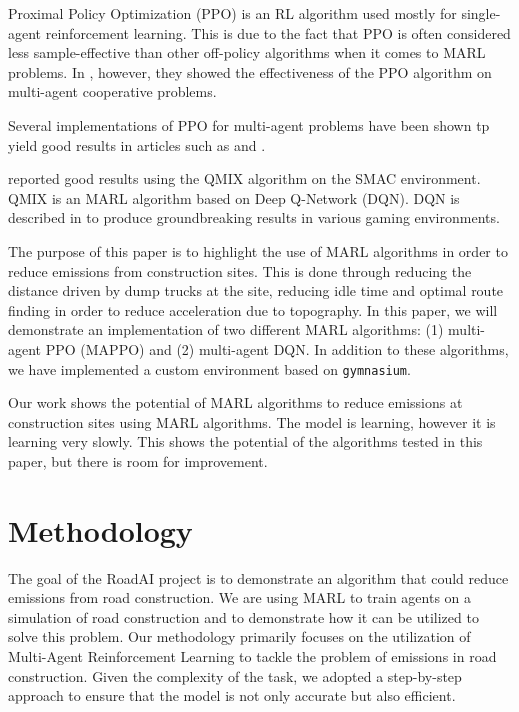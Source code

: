 \documentclass[conference]{IEEEtran}
\begin{document}

Proximal Policy Optimization (PPO) is an RL algorithm used mostly for single-agent reinforcement learning.
This is due to the fact that PPO is often considered less sample-effective than other off-policy algorithms
when it comes to MARL problems. In \cite{yu2022surprising}, however, they showed the effectiveness of the PPO
algorithm on multi-agent cooperative problems.

Several implementations of PPO for multi-agent problems have been shown tp yield good results in articles such
as \cite{ellis2022smacv2} and \cite{laurent2021flatland}.


\cite{ellis2022smacv2} reported good results using the QMIX algorithm on the SMAC environment. QMIX is an
MARL algorithm based on Deep Q-Network (DQN). DQN is described in \cite{DBLP:journals/corr/MnihKSGAWR13} to
produce groundbreaking results in various gaming environments.


The purpose of this paper is to highlight the use of MARL algorithms in order to reduce \coo{} emissions
from construction sites. This is done through reducing the distance driven by dump trucks at the site,
reducing idle time and optimal route finding in order to reduce acceleration due to topography. In this
paper, we will demonstrate an implementation of two different MARL algorithms:
(1) multi-agent PPO (MAPPO) and (2) multi-agent DQN. In addition to these algorithms, we have implemented a
custom environment based on \texttt{gymnasium}. \cite{Towers_Gymnasium}

Our work shows the potential of MARL algorithms to reduce emissions at construction sites using MARL
algorithms. The model is learning, however it is learning very slowly. This shows the potential of
the algorithms tested in this paper, but there is room for improvement.


\section{Methodology}
The goal of the RoadAI project is to demonstrate an algorithm that could reduce emissions from road construction.
We are using MARL to train agents on a simulation of road construction and to demonstrate how it can be utilized to solve this problem.
Our methodology primarily focuses on the utilization of Multi-Agent Reinforcement Learning to tackle the problem of emissions in road construction. Given the complexity of the task, we adopted a step-by-step approach to ensure that the model is not only accurate but also efficient.
\end{document}
